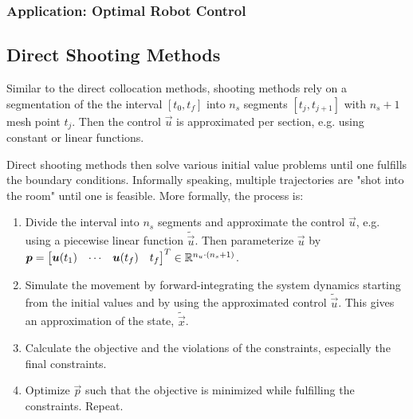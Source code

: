 			\subsubsection{Application: Optimal Robot Control} %

		\subsection{Direct Shooting Methods}
			Similar to the direct collocation methods, shooting methods rely on a segmentation of the the interval \( [t_0, t_f] \) into \( n_s \) segments \( [t_j, t_{j + 1}] \) with \( n_s + 1 \) mesh point \( t_j \). Then the control \(\vec{u}\) is approximated per section, e.g. using constant or linear functions.

			Direct shooting methods then solve various initial value problems until one fulfills the boundary conditions. Informally speaking, multiple trajectories are "shot into the room" until one is feasible. More formally, the process is:
			\begin{enumerate}
				\item Divide the interval into \(n_s\) segments and approximate the control \(\vec{u}\), e.g. using a piecewise linear function \( \tilde{\vec{u}} \). Then parameterize \(\vec{u}\) by \( \bm{p} = \begin{bmatrix} \bm{u}(t_1) & \cdots & \bm{u}(t_f) & t_f \end{bmatrix}^T \in \mathbb{R}^{n_u \cdot (n_s + 1)} \).
				\item Simulate the movement by forward-integrating the system dynamics starting from the initial values and by using the approximated control \( \tilde{\vec{u}} \). This gives an approximation of the state, \( \tilde{\vec{x}} \).
				\item Calculate the objective and the violations of the constraints, especially the final constraints.
				\item Optimize \(\vec{p}\) such that the objective is minimized while fulfilling the constraints. Repeat.
			\end{enumerate}

